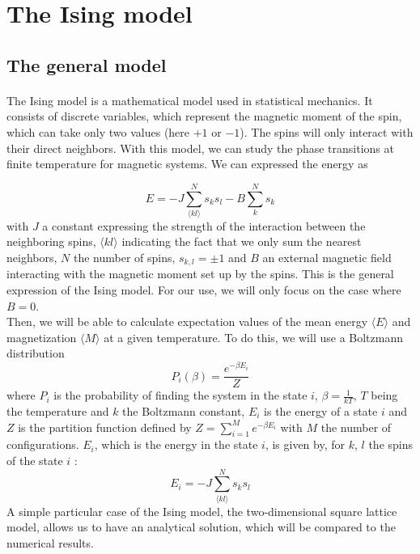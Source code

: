 \documentclass[a4paper, twoside, 11pt]{report}
\theoremstyle{theorem}
\theoremstyle{remark}
\theoremstyle{exemple}
\begin{document}
    \section{The Ising model}
    
        \subsection{The general model}
        
            \paragraph{}The Ising model is a mathematical model used in statistical mechanics. It consists of discrete variables, which represent the magnetic moment of the spin, which can take only two values (here $+1$ or $-1$). The spins will only interact with their direct neighbors. With this model, we can study the phase transitions at finite temperature for magnetic systems. We can expressed the energy as 
                
                \begin{equation*}
                    E = -J \sum\limits_{\langle  kl\rangle}^{N}s_ks_l - B \sum\limits_{k}^{N}s_k
                    \tag{1}
                \end{equation*}
            with $J$ a constant expressing the strength of the interaction between the neighboring spins, $\langle kl \rangle$ indicating the fact that we only sum the nearest neighbors, $N$ the number of spins, $s_{k,l} = \pm 1$ and $B$ an external magnetic field interacting with the magnetic moment set up by the spins. This is the general expression of the Ising model. For our use, we will only focus on the case where $B=0$. \\
            Then, we will be able to calculate expectation values of the mean energy $\langle E \rangle$ and magnetization $\langle M \rangle$ at a given temperature. To do this, we will use a Boltzmann distribution
                \begin{equation*}
                    P_i(\beta) = \frac{e^{-\beta E_i}}{Z}
                    \tag{2}
                \end{equation*}
            where $P_i$ is the probability of finding the system in the state $i$, $\beta = \frac{1}{kT}$, $T$ being the temperature and $k$ the Boltzmann constant, $E_i$ is the energy of a state $i$ and $Z$ is the partition function defined by $\displaystyle Z = \sum\limits_{i=1}^{M}e^{-\beta E_i}$ with $M$ the number of configurations. $E_i$, which is the energy in the state $i$, is given by, for $k$, $l$ the spins of the state $i$ : 
                \begin{equation*}
                    E_i = -J \sum\limits_{\langle kl \rangle}^{N}s_ks_l 
                    \tag{3}
                \end{equation*} 
            A simple particular case of the Ising model, the two-dimensional square lattice model, allows us to have an analytical solution, which will be compared to the numerical results.
        
\end{document}
